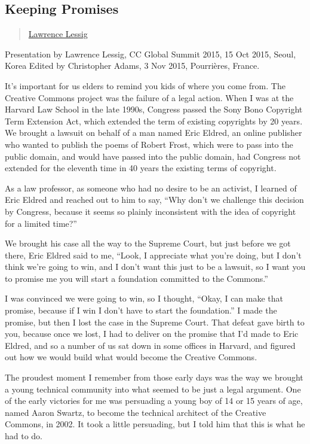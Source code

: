 \subsection{Keeping Promises}\label{keeping-promises}

\begin{quote}
\href{../appendix/attributions.html\#lawrence-lessig}{Lawrence Lessig}
\end{quote}

Presentation by Lawrence Lessig, CC Global Summit 2015, 15 Oct 2015,
Seoul, Korea Edited by Christopher Adams, 3 Nov 2015, Pourrières,
France.

It's important for us elders to remind you kids of where you come from.
The Creative Commons project was the failure of a legal action. When I
was at the Harvard Law School in the late 1990s, Congress passed the
Sony Bono Copyright Term Extension Act, which extended the term of
existing copyrights by 20 years. We brought a lawsuit on behalf of a man
named Eric Eldred, an online publisher who wanted to publish the poems
of Robert Frost, which were to pass into the public domain, and would
have passed into the public domain, had Congress not extended for the
eleventh time in 40 years the existing terms of copyright.

As a law professor, as someone who had no desire to be an activist, I
learned of Eric Eldred and reached out to him to say, ``Why don't we
challenge this decision by Congress, because it seems so plainly
inconsistent with the idea of copyright for a limited time?''

We brought his case all the way to the Supreme Court, but just before we
got there, Eric Eldred said to me, ``Look, I appreciate what you're
doing, but I don't think we're going to win, and I don't want this just
to be a lawsuit, so I want you to promise me you will start a foundation
committed to the Commons.''

I was convinced we were going to win, so I thought, ``Okay, I can make
that promise, because if I win I don't have to start the foundation.'' I
made the promise, but then I lost the case in the Supreme Court. That
defeat gave birth to you, because once we lost, I had to deliver on the
promise that I'd made to Eric Eldred, and so a number of us sat down in
some offices in Harvard, and figured out how we would build what would
become the Creative Commons.

The proudest moment I remember from those early days was the way we
brought a young technical community into what seemed to be just a legal
argument. One of the early victories for me was persuading a young boy
of 14 or 15 years of age, named Aaron Swartz, to become the technical
architect of the Creative Commons, in 2002. It took a little persuading,
but I told him that this is what he had to do.

